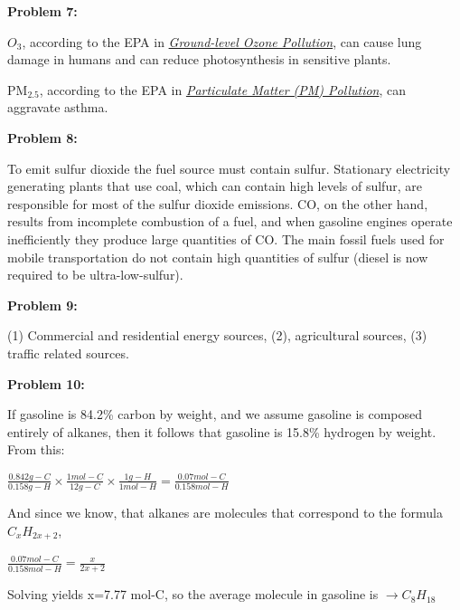 \documentclass[10pt]{article}
\begin{document}
\begin{flushleft}
        \hrulefill

        \textbf{Problem 7:}

        $O_3$, according to the EPA in 
        \href{https://www.epa.gov/ground-level-ozone-pollution/ecosystem-effects-ozone-pollution}{\textit{Ground-level Ozone Pollution}}, can cause lung damage in humans and can reduce photosynthesis in sensitive plants.

        PM$_{2.5}$, according to the EPA in \href{https://www.epa.gov/pm-pollution/health-and-environmental-effects-particulate-matter-pm}{\textit{Particulate Matter (PM) Pollution}}, can aggravate asthma.

        \hrulefill

        \textbf{Problem 8:}

        To emit sulfur dioxide the fuel source must contain sulfur. Stationary electricity generating plants that use coal, which can contain high levels of sulfur, are responsible for most of the sulfur dioxide emissions. CO, on the other hand, results from incomplete combustion of a fuel, and when gasoline engines operate inefficiently they produce large quantities of CO. The main fossil fuels used for mobile transportation do not contain high quantities of sulfur (diesel is now required to be ultra-low-sulfur).

        \hrulefill

        \textbf{Problem 9:}

        (1) Commercial and residential energy sources, (2), agricultural sources, (3) traffic related sources.

        \hrulefill

        \textbf{Problem 10:}

        If gasoline is 84.2\% carbon by weight, and we assume gasoline is composed entirely of alkanes, then it follows that gasoline is 15.8\% hydrogen by weight. From this:

        $\frac{0.842 g-C}{0.158 g-H}\times \frac{1 mol-C}{12 g-C} \times \frac{1 g-H}{1 mol-H}=\frac{0.07 mol-C}{0.158 mol-H}$

        And since we know, that alkanes are molecules that correspond to the formula $C_xH_{2x+2}$,

        $\frac{0.07 mol-C}{0.158 mol-H}=\frac{x}{2x+2}$

        Solving yields x=7.77 mol-C, so the average molecule in gasoline is $\rightarrow C_{8}H_{18}$



    \end{flushleft}

 
\end{document}
